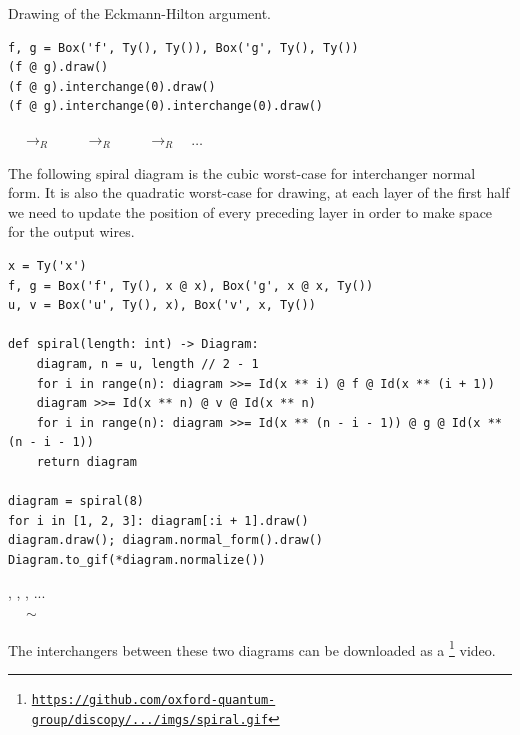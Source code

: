 \begin{example}
{\normalfont Drawing of the Eckmann-Hilton argument.}

\begin{verbatim}
f, g = Box('f', Ty(), Ty()), Box('g', Ty(), Ty())
(f @ g).draw()
(f @ g).interchange(0).draw()
(f @ g).interchange(0).interchange(0).draw()
\end{verbatim}

\begin{center}
$\quad \to_R \quad$ 
$\quad \to_R \quad$ 
$\quad \to_R \quad \dots$
\end{center}
\end{example}

\begin{example}\label{example:spiral}
The following spiral diagram is the cubic worst-case for interchanger normal form.
It is also the quadratic worst-case for drawing, at each layer of the first half we need to update the position of every preceding layer in order to make space for the output wires.

\begin{verbatim}
x = Ty('x')
f, g = Box('f', Ty(), x @ x), Box('g', x @ x, Ty())
u, v = Box('u', Ty(), x), Box('v', x, Ty())

def spiral(length: int) -> Diagram:
    diagram, n = u, length // 2 - 1
    for i in range(n): diagram >>= Id(x ** i) @ f @ Id(x ** (i + 1))
    diagram >>= Id(x ** n) @ v @ Id(x ** n)
    for i in range(n): diagram >>= Id(x ** (n - i - 1)) @ g @ Id(x ** (n - i - 1))
    return diagram

diagram = spiral(8)
for i in [1, 2, 3]: diagram[:i + 1].draw()
diagram.draw(); diagram.normal_form().draw()
Diagram.to_gif(*diagram.normalize())
\end{verbatim}
\begin{center}
,
,
, ... \\
\vspace{5pt}
 $\quad \sim \quad$
\end{center}

The interchangers between these two diagrams can be downloaded as a \footnote
{\href{https://github.com/oxford-quantum-group/discopy/blob/f364ce218890d87fda4aa5c1f4f770f07c7b4f25/docs/_static/imgs/spiral.gif}{\nolinkurl{https://github.com/oxford-quantum-group/discopy/.../imgs/spiral.gif}}} video.
\end{example}

